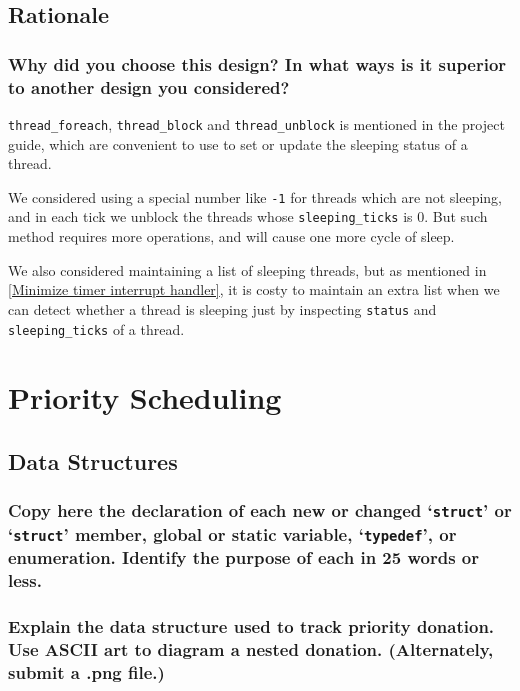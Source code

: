 \documentclass[sigconf, nonacm]{acmart}
\begin{document}
        \subsection{Rationale}
            
            \subsubsection{Why did you choose this design? In what ways is it superior to another design you considered? }
                \texttt{thread\_foreach}, \texttt{thread\_block} and \texttt{thread\_unblock} is mentioned in the project guide, which are convenient to use to set or update the sleeping status of a thread.

                We considered using a special number like \texttt{-1} for threads which are not sleeping, and in each tick we unblock the threads whose \texttt{sleeping\_ticks} is 0. But such method requires more operations, and will cause one more cycle of sleep. 

                We also considered maintaining a list of sleeping threads, but as mentioned in \ref{Minimize timer interrupt handler}, it is costy to maintain an extra list when we can detect whether a thread is sleeping just by inspecting \texttt{status} and \texttt{sleeping\_ticks} of a thread. 
    
    \section{Priority Scheduling}

        \subsection{Data Structures}
            
            \subsubsection{Copy here the declaration of each new or changed `\texttt{struct}' or `\texttt{struct}' member, global or static variable, `\texttt{typedef}', or enumeration. Identify the purpose of each in 25 words or less. } 

            \subsubsection{Explain the data structure used to track priority donation. Use ASCII art to diagram a nested donation.  (Alternately, submit a .png file.)}
\end{document}
